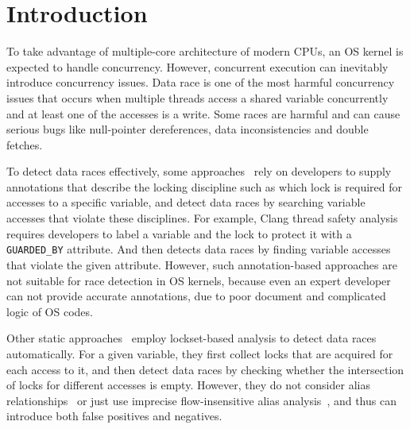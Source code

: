 \section{Introduction}
\label{sec_introduction}

To take advantage of multiple-core architecture of modern CPUs, an OS kernel is 
expected to handle concurrency. However, concurrent execution can inevitably 
introduce concurrency issues. Data race is one of the most harmful concurrency 
issues that occurs when multiple threads access a shared variable concurrently 
and at least one of the accesses is a write. Some races are harmful and can 
cause serious bugs like null-pointer dereferences, data inconsistencies and 
double fetches.

To detect data races effectively, some approaches~\cite{Boyapati:OOPSLA02, 
Anderson:PLDI08, Anderson:PLDI09, Zhou:MICRO19, Flanagan:PASTE01, 
Flanagan:PLDI00, Sadowski:PLATEAU14, ClangThreadSafety, Blackshear:OOPSLA18} 
rely on developers to supply annotations that describe the locking discipline 
such as which lock is required for accesses to a specific variable, and detect 
data races by searching variable accesses that violate these disciplines. For 
example, Clang thread safety analysis~\cite{ClangThreadSafety} requires 
developers to label a variable and the lock to protect it with a {\tt 
GUARDED\_BY} attribute. And then detects data races by finding variable 
accesses that violate the given attribute. However, such annotation-based 
approaches are not suitable for race detection in OS kernels, because even an 
expert developer can not provide accurate annotations, due to poor document and 
complicated logic of OS codes.

Other static approaches~\cite{Choi:PLDI02, Engler:SOSP03, Voung:FSE07, 
Pratikakis:PLDI06, Naik:PLDI06} employ lockset-based analysis to detect data 
races automatically. For a given variable, they first collect locks that are 
acquired for each access to it, and then detect data races by checking whether 
the intersection of locks for different accesses is empty. However, they do not 
consider alias relationships~\cite{Voung:FSE07, Engler:SOSP03} or just use 
imprecise flow-insensitive alias analysis~\cite{Choi:PLDI02, Pratikakis:PLDI06, 
Naik:PLDI06}, and thus can introduce both false positives and negatives.

